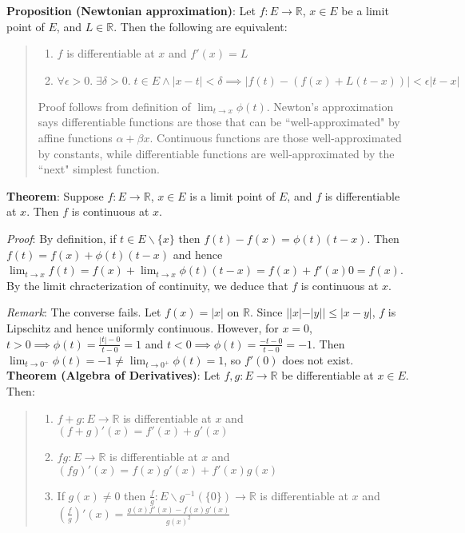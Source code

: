\documentclass[11pt]{article}
\begin{document}
\textbf{Proposition (Newtonian approximation)}: Let $f : E \to \mathbb{R}$, $x \in E$ be a limit point of $E$, and $L \in \mathbb{R}$. Then the following are equivalent:
\begin{quote}\vspace{-0.3cm}
	\begin{enumerate}
	\item $f$ is differentiable at $x$ and $f'(x) = L$
	\item $\forall \epsilon > 0.\; \exists \delta > 0.\; t \in E \land |x-t| < \delta \implies |f(t) - (f(x) + L(t-x))| < \epsilon|t-x|$
	\end{enumerate}
	Proof follows from definition of $\lim_{t \to x} \phi(t)$. Newton's approximation says differentiable functions are those that can be ``well-approximated" by affine functions $\alpha + \beta x$. Continuous functions are those well-approximated by constants, while differentiable functions are well-approximated by the ``next" simplest function.
\end{quote}

\textbf{Theorem}: Suppose $f : E \to \mathbb{R}$, $x \in E$ is a limit point of $E$, and $f$ is differentiable at $x$. Then $f$ is continuous at $x$.

\emph{Proof}: By definition, if $t \in E \backslash \{x\}$ then $f(t) - f(x) = \phi(t) (t-x)$. Then $f(t) = f(x) + \phi(t)(t-x)$ and hence $\lim_{t \to x}f(t) = f(x) + \lim_{t \to x} \phi(t) (t-x) = f(x) + f'(x) 0 = f(x)$. By the limit chracterization of continuity, we deduce that $f$ is continuous at $x$.

\emph{Remark}: The converse fails. Let $f(x) = |x|$ on $\mathbb{R}$. Since $||x|-|y|| \leq |x-y|$, $f$ is Lipschitz and hence uniformly continuous. However, for $x = 0$, $t > 0 \implies \phi(t) = \frac{|t|-0}{t-0} = 1$ and $t < 0 \implies \phi(t) = \frac{-t-0}{t-0} = -1$. Then $\lim_{t \to 0^-} \phi(t) = -1 \neq \lim_{t \to 0^+} \phi(t) = 1$, so $f'(0)$ does not exist.\\

\textbf{Theorem (Algebra of Derivatives)}: Let $f, g : E \to \mathbb{R}$ be differentiable at $x \in E$. Then:
\begin{quote}\vspace{-0.3cm}
	\begin{enumerate}
	\item $f + g : E \to \mathbb{R}$ is differentiable at $x$ and $(f+g)'(x) = f'(x) + g'(x)$
	\item $fg : E \to \mathbb{R}$ is differentiable at $x$ and $(fg)'(x) = f(x)g'(x) + f'(x)g(x)$
	\item If $g(x) \neq 0$ then $\frac{f}{g} : E \backslash g^{-1}(\{0\}) \to \mathbb{R}$ is differentiable at $x$ and $(\frac{f}{g})'(x) = \frac{g(x)f'(x) - f(x)g'(x)}{g(x)^2}$
	\end{enumerate}
\end{quote}
\end{document}
